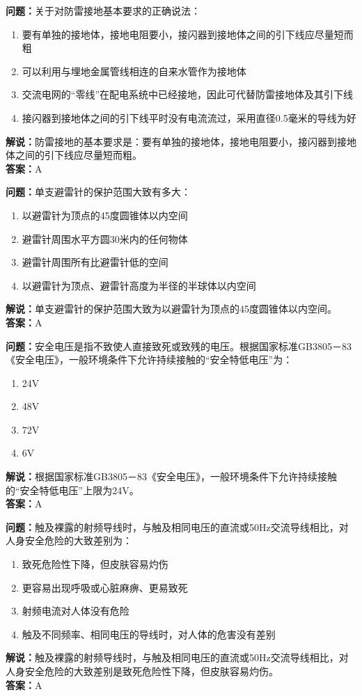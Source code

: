 \documentclass[UTF8]{ctexbook}
\begin{document}
\textbf{问题：}关于对防雷接地基本要求的正确说法：
\begin{enumerate}[label=\Alph*), leftmargin=3em]
  \item 要有单独的接地体，接地电阻要小，接闪器到接地体之间的引下线应尽量短而粗
  \item 可以利用与埋地金属管线相连的自来水管作为接地体
  \item 交流电网的“零线”在配电系统中已经接地，因此可代替防雷接地体及其引下线
  \item 接闪器到接地体之间的引下线平时没有电流流过，采用直径0.5毫米的导线为好
\end{enumerate}
\textbf{解说：}防雷接地的基本要求是：要有单独的接地体，接地电阻要小，接闪器到接地体之间的引下线应尽量短而粗。\\
\textbf{答案：}A

\textbf{问题：}单支避雷针的保护范围大致有多大：
\begin{enumerate}[label=\Alph*), leftmargin=3em]
  \item 以避雷针为顶点的45度圆锥体以内空间
  \item 避雷针周围水平方圆30米内的任何物体
  \item 避雷针周围所有比避雷针低的空间
  \item 以避雷针为顶点、避雷针高度为半径的半球体以内空间
\end{enumerate}
\textbf{解说：}单支避雷针的保护范围大致为以避雷针为顶点的45度圆锥体以内空间。\\
\textbf{答案：}A

\textbf{问题：}安全电压是指不致使人直接致死或致残的电压。根据国家标准GB3805－83《安全电压》，一般环境条件下允许持续接触的“安全特低电压”为：
\begin{enumerate}[label=\Alph*), leftmargin=3em]
  \item 24V
  \item 48V
  \item 72V
  \item 6V
\end{enumerate}
\textbf{解说：}根据国家标准GB3805－83《安全电压》，一般环境条件下允许持续接触的“安全特低电压”上限为24V。\\
\textbf{答案：}A

\textbf{问题：}触及裸露的射频导线时，与触及相同电压的直流或50Hz交流导线相比，对人身安全危险的大致差别为：
\begin{enumerate}[label=\Alph*), leftmargin=3em]
  \item 致死危险性下降，但皮肤容易灼伤
  \item 更容易出现呼吸或心脏麻痹、更易致死
  \item 射频电流对人体没有危险
  \item 触及不同频率、相同电压的导线时，对人体的危害没有差别
\end{enumerate}
\textbf{解说：}触及裸露的射频导线时，与触及相同电压的直流或50Hz交流导线相比，对人身安全危险的大致差别是致死危险性下降，但皮肤容易灼伤。\\
\textbf{答案：}A
\end{document}
